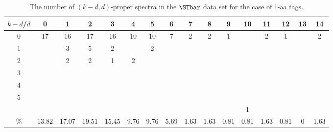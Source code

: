 \begin{landscape}

\begin{table}[h]\footnotesize
{\centering
\begin{tabular}{|c|c|
c|c|c|c|c|c|c|c|c|c|c|c|c|c|}
  \hline
  $k-d$/$d$
 & 0 & 1 & 2 & 3 & 4 & 5 & 6 & 7 & 8 & 9 & 10 & 11 & 12 & 13 & 14\\

  \hline
  \hline

0  & 17 & 16 & 17 & 16 & 10 & 10 & 7 & 2 & 2 & 1 &  & 2 & 1 &  & 2\\

1  &  & 3 & 5 & 2 &  & 2 &  &  &  &  &  &  &  &  & \\

2  &  & 2 & 2 & 1 & 2 &  &  &  &  &  &  &  &  &  & \\

3  &  &  &  &  &  &  &  &  &  &  &  &  &  &  & \\

4  &  &  &  &  &  &  &  &  &  &  &  &  &  &  & \\

5  &  &  &  &  &  &  &  &  &  &  &  &  &  &  & \\

\ge6  &  &  &  &  &  &  &  &  &  &  & 1 &  &  &  & \\

  \hline

 \%  & 13.82 & 17.07 & 19.51 & 15.45 & 9.76 & 9.76 & 5.69 & 1.63 & 1.63 & 0.81 & 0.81 & 1.63 & 0.81 & 0 & 1.63\\

  \hline
\end{tabular}
\par}
\centering
\caption{The number of $(k-d,d)$-proper spectra in the $\STbar$ data set for the case of 1-aa tags.}
\vspace{3mm}
\label{table:kd-1-proper-ST-bar2}
\end{table}
\end{landscape}

